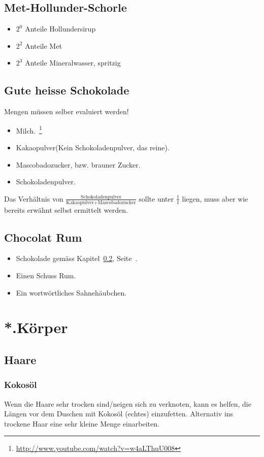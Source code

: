 \documentclass[oneside,12pt,a4paper]{scrartcl}
\begin{document}
\subsection{Met-Hollunder-Schorle}
\begin{itemize}
\item $2^{0}$ Anteile Hollundersirup
\item $2^{2}$ Anteile Met
\item $2^{3}$ Anteile Mineralwasser, spritzig
\end{itemize}
\subsection{Gute heisse Schokolade}
\label{sec:hot_chocolate}
Mengen müssen selber evaluiert werden!
\begin{itemize}
	\item Milch.~\footnote{\url{http://www.youtube.com/watch?v=w4aLThuU008}}
	\item Kakaopulver(Kein Schokoladenpulver, das reine).
	\item Mascobadozucker, bzw. brauner Zucker.
	\item Schokoladenpulver.
\end{itemize}
Das Verhältnis von $\frac{\mbox{Schokoladenpulver}}{\mbox{Kakaopulver}+\mbox{Mascobadozucker}}$ sollte unter $\frac{1}{1}$ liegen, muss aber wie bereits erwähnt selbst ermittelt werden.
\subsection{Chocolat Rum}
\begin{itemize}
	\item Schokolade gemäss Kapitel~\ref{sec:hot_chocolate}, Seite~\pageref{sec:hot_chocolate}.
	\item Einen Schuss Rum.
	\item Ein wortwörtliches Sahnehäubchen.
\end{itemize}
\section{*.Körper}
\subsection{Haare}
\subsubsection{Kokosöl}
Wenn die Haare sehr trocken sind/neigen sich zu verknoten, kann es helfen, die Längen vor dem Duschen mit Kokosöl (echtes) einzufetten. Alternativ ins trockene Haar eine sehr kleine Menge einarbeiten.
\end{document}
